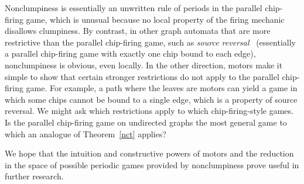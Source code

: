 Nonclumpiness is essentially an unwritten rule of periods in the parallel
chip-firing game, which is unusual because no local property of the firing
mechanic disallows clumpiness. By contrast, in other graph automata that are
more restrictive than the parallel chip-firing game, such as \emph{source
  reversal}~\cite{sourceReversal} (essentially a parallel chip-firing game with
exactly one chip bound to each edge), nonclumpiness is obvious, even
locally. In the other direction, motors make it simple to show that certain
stronger restrictions do not apply to the parallel chip-firing game. For
example, a path where the leaves are motors can yield a game in which some
chips cannot be bound to a single edge, which is a property of source
reversal. We might ask which restrictions apply to which chip-firing-style
games. Is the parallel chip-firing game on undirected graphs the most general
game to which an analogue of Theorem~\ref{nct} applies?

We hope that the intuition and constructive powers of motors and the reduction
in the space of possible periodic games provided by nonclumpiness prove useful
in further research. \FloatBarrier
